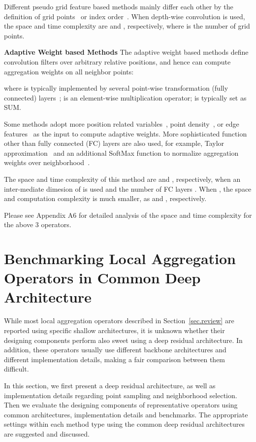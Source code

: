 \documentclass[runningheads]{llncs}
\begin{document}
Different pseudo grid feature based methods mainly differ each other by the definition of grid points~\cite{hua2018pointwise,mao2019interpolated,zhang2019shellnet,lan2019modeling,tatarchenko2018tangent} or index order~\cite{li2018pointcnn}. When depth-wise convolution is used, the space and time complexity are   and , respectively, where  is the number of grid points.

\vspace{0.3em} \noindent \textbf{Adaptive Weight based Methods} The adaptive weight based methods define convolution filters over arbitrary relative positions, and hence can compute aggregation weights on all neighbor points:

where  is typically implemented by several point-wise transformation (fully connected) layers~\cite{wang2018paramconv,groh2018flex};  is an element-wise multiplication operator;  is typically set as SUM.

Some methods adopt more position related variables~\cite{liu2019rscnn}, point density~\cite{wu2019pointconv}, or edge features~\cite{wang2019graph} as the input to compute adaptive weights. More sophisticated function other than fully connected (FC) layers are also used, for example, Taylor approximation~\cite{li2018pointcnn} and an additional SoftMax function to normalize aggregation weights over neighborhood~\cite{wang2019graph}.

The space and time complexity of this method are  and , respectively, when an inter-mediate dimesion of  is used and the number of FC layers . When , the space and computation complexity is much smaller, as  and , respectively.

Please see Appendix A6 for detailed analysis of the space and time complexity for the above 3 operators.

\section{Benchmarking Local Aggregation Operators in Common Deep Architecture}

While most local aggregation operators described in Section~\ref{sec.review} are reported using specific shallow architectures, it is unknown whether their designing components perform also sweet using a deep residual architecture. In addition, these operators usually use different backbone architectures and different implementation details, making a fair comparison between them difficult.

In this section, we first present a deep residual architecture, as well as implementation details regarding point sampling and neighborhood selection. Then we evaluate the designing components of representative operators using common architectures, implementation details and benchmarks. The appropriate settings within each method type using the common deep residual architectures are suggested and discussed.
\end{document}
